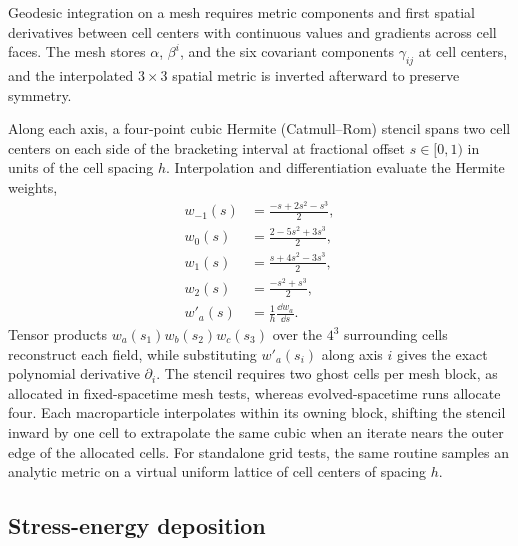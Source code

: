 Geodesic integration on a mesh requires metric components and first spatial derivatives between cell centers with continuous values and gradients across cell faces. The mesh stores $\alpha$, $\beta^i$, and the six covariant components $\gamma_{ij}$ at cell centers, and the interpolated $3 \times 3$ spatial metric is inverted afterward to preserve symmetry.

Along each axis, a four-point cubic Hermite (Catmull--Rom) stencil spans two cell centers on each side of the bracketing interval at fractional offset $s \in [0,1)$ in units of the cell spacing $h$. Interpolation and differentiation evaluate the Hermite weights,
\begin{align}\label{eq:hermite_weights}
w_{-1}(s) &= \frac{-s + 2s^2 - s^3}{2}, \nonumber\\
w_{0}(s) &= \frac{2 - 5s^2 + 3s^3}{2}, \nonumber\\
w_{1}(s) &= \frac{s + 4s^2 - 3s^3}{2}, \nonumber\\
w_{2}(s) &= \frac{-s^2 + s^3}{2}, \nonumber\\
w'_a(s) &= \frac{1}{h}\frac{\dd w_a}{\dd s}.
\end{align}
Tensor products $w_a(s_1) w_b(s_2) w_c(s_3)$ over the $4^3$ surrounding cells reconstruct each field, while substituting $w'_a(s_i)$ along axis $i$ gives the exact polynomial derivative $\partial_i$. The stencil requires two ghost cells per mesh block, as allocated in fixed-spacetime mesh tests, whereas evolved-spacetime runs allocate four. Each macroparticle interpolates within its owning block, shifting the stencil inward by one cell to extrapolate the same cubic when an iterate nears the outer edge of the allocated cells. For standalone grid tests, the same routine samples an analytic metric on a virtual uniform lattice of cell centers of spacing $h$.

\subsection{Stress-energy deposition}\label{sec:deposition}

